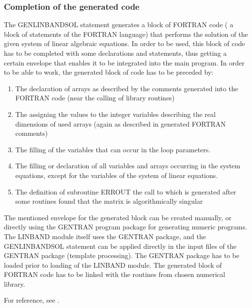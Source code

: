 \subsubsection{Completion of the generated code}


     The GENLINBANDSOL statement generates a block  of FORTRAN  code ( a
block of  statements of the FORTRAN language) that performs the solution
of the given system of linear algebraic equations. In order  to be used,
this  block  of  code  has  to  be  completed with some declarations and
statements, thus getting  a  certain  envelope  that  enables  it  to be
integrated into the main program.
     In order  to be able to work, the generated block of code has to be
preceded by:
\begin{enumerate}
  \item The declaration  of arrays as  described by the  comments generated
  into the FORTRAN code (near the calling of library routines)

  \item The assigning  the values to  the integer variables  describing the
  real  dimensions  of  used  arrays  (again  as  described in generated
  FORTRAN comments)

  \item The filling of the variables that can occur in the loop parameters.

  \item The filling or declaration of all variables and arrays occurring in
  the system equations, except for the variables of the system of linear
  equations.

  \item The definition of subroutine ERROUT the call to which is  generated
  after some routines found that the matrix is algorithmically singular
\end{enumerate}
     The  mentioned  envelope  for  the  generated  block can be created
manually, or directly using  the GENTRAN program package  for generating
numeric programs. The  LINBAND module itself  uses the GENTRAN  package,
and the  GENLINBANDSOL statement  can be  applied directly  in the input
files of the GENTRAN package (template processing). The GENTRAN  package
has to be loaded prior to loading of the LINBAND module.
     The  generated  block  of  FORTRAN  code  has to be linked with the
routines from chosen numerical library.

For reference, see \cite{Liska:91b}.
